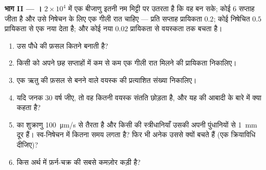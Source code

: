 \begin{problem}
\medskip
\noindent\textbf{भाग II --- ।}
$2\times 10^{4}$ में एक बीजाणु इतनी नम मिट्टी पर उतरता है कि वह
 बन सके; कोई  \num{6} सप्ताह जीता है और उसे निषेचन के
लिए एक गीली रात चाहिए --- प्रति सप्ताह प्रायिकता $0.2$; कोई
निषेचित  $0.5$ प्रायिकता से एक नया 
देता है; और कोई नया  $0.02$ प्रायिकता से
वयस्कता तक बचता है।
\begin{enumerate}[resume]
  \item उस पौधे की फ़सल कितने  बनाती है?
  \item किसी  को अपने छह सप्ताहों में कम से कम एक गीली रात
        मिलने की प्रायिकता निकालिए।
  \item एक ऋतु की फ़सल से बनने वाले वयस्क  की
        प्रत्याशित संख्या निकालिए।
  \item यदि जनक \num{30} वर्ष जीए, तो वह कितनी वयस्क संतति छोड़ता है,
        और यह  की आबादी के बारे में क्या
        कहता है?
  \item {} का शुक्राणु \qty{100}{\micro m/s} से तैरता है और किसी 
        की स्त्रीधानियाँ उसकी अपनी पुंधानियों से \qty{1}{mm} दूर हैं।
        स्व-निषेचन में कितना समय लगता है? फिर भी अनेक  उससे
        क्यों बचते हैं (एक क्रियाविधि दीजिए)?
  \item {} किस अर्थ में फ़र्न-चक्र की सबसे कमज़ोर
        कड़ी है?
\end{enumerate}


\end{problem}
